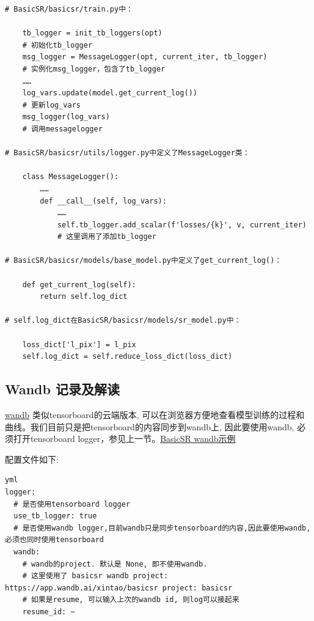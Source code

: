 \documentclass[../main.tex]{subfiles}
\begin{document}
\begin{verbatim}
# BasicSR/basicsr/train.py中：

    tb_logger = init_tb_loggers(opt)
    # 初始化tb_logger
    msg_logger = MessageLogger(opt, current_iter, tb_logger)
    # 实例化msg_logger，包含了tb_logger
    ……
    log_vars.update(model.get_current_log())
    # 更新log_vars
    msg_logger(log_vars)
    # 调用messagelogger

# BasicSR/basicsr/utils/logger.py中定义了MessageLogger类：

    class MessageLogger():
        ……
        def __call__(self, log_vars):
            ……
            self.tb_logger.add_scalar(f'losses/{k}', v, current_iter)
            # 这里调用了添加tb_logger

# BasicSR/basicsr/models/base_model.py中定义了get_current_log()：

    def get_current_log(self):
        return self.log_dict

# self.log_dict在BasicSR/basicsr/models/sr_model.py中：

    loss_dict['l_pix'] = l_pix
    self.log_dict = self.reduce_loss_dict(loss_dict)
\end{verbatim}


\subsection{Wandb 记录及解读}

\href{https://www.wandb.com/}{wandb} 类似tensorboard的云端版本, 可以在浏览器方便地查看模型训练的过程和曲线。我们目前只是把tensorboard的内容同步到wandb上, 因此要使用wandb, 必须打开tensorboard logger，参见上一节。\href{https://wandb.ai/xintao/basicsr?workspace=user-}{BasicSR wandb示例}

配置文件如下:
\begin{verbatim}
yml
logger:
  # 是否使用tensorboard logger
  use_tb_logger: true
  # 是否使用wandb logger,目前wandb只是同步tensorboard的内容,因此要使用wandb, 必须也同时使用tensorboard
  wandb:
    # wandb的project. 默认是 None, 即不使用wandb.
    # 这里使用了 basicsr wandb project: https://app.wandb.ai/xintao/basicsr project: basicsr
    # 如果是resume, 可以输入上次的wandb id, 则log可以接起来
    resume_id: ~
\end{verbatim}
\end{document}
